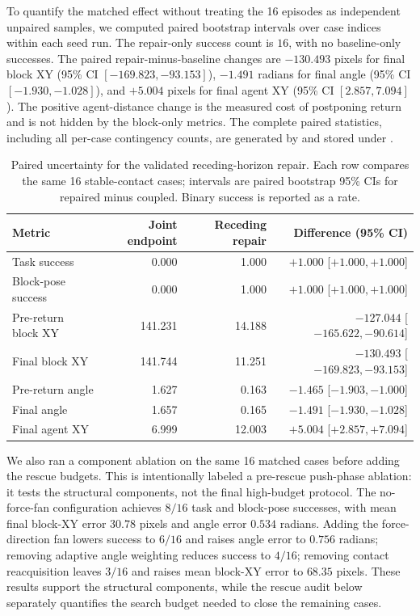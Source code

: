 \documentclass{article}
\begin{document}
To quantify the matched effect without treating the 16 episodes as independent
unpaired samples, we computed paired bootstrap intervals over case indices
within each seed run.  The repair-only success count is $16$, with no
baseline-only successes.  The paired repair-minus-baseline changes are
$-130.493$ pixels for final block XY (95\% CI
$[-169.823,-93.153]$), $-1.491$ radians for final angle (95\% CI
$[-1.930,-1.028]$), and $+5.004$ pixels for final agent XY (95\% CI
$[2.857,7.094]$).  The positive agent-distance change is the measured cost of
postponing return and is not hidden by the block-only metrics.  The complete
paired statistics, including all per-case contingency counts, are generated by
 and stored under
.

\begin{table}[H]
\centering
\scriptsize
\setlength{\tabcolsep}{4pt}
\caption{Paired uncertainty for the validated receding-horizon repair. Each
row compares the same 16 stable-contact cases; intervals are paired bootstrap
95\% CIs for repaired minus coupled. Binary success is reported as a rate.}
\label{tab:supp-receding-paired-stats}
\begin{tabular}{lrrr}
\toprule
Metric & Joint endpoint & Receding repair & Difference (95\% CI) \\
\midrule
Task success & 0.000 & 1.000 & $+1.000$ [$+1.000,+1.000$] \\
Block-pose success & 0.000 & 1.000 & $+1.000$ [$+1.000,+1.000$] \\
Pre-return block XY & 141.231 & 14.188 & $-127.044$ [$-165.622,-90.614$] \\
Final block XY & 141.744 & 11.251 & $-130.493$ [$-169.823,-93.153$] \\
Pre-return angle & 1.627 & 0.163 & $-1.465$ [$-1.903,-1.000$] \\
Final angle & 1.657 & 0.165 & $-1.491$ [$-1.930,-1.028$] \\
Final agent XY & 6.999 & 12.003 & $+5.004$ [$+2.857,+7.094$] \\
\bottomrule
\end{tabular}
\end{table}

We also ran a component ablation on the same 16 matched cases before adding
the rescue budgets.  This is intentionally labeled a pre-rescue push-phase
ablation: it tests the structural components, not the final high-budget
protocol.  The no-force-fan configuration achieves $8/16$ task and block-pose
successes, with mean final block-XY error $30.78$ pixels and angle error
$0.534$ radians.  Adding the force-direction fan lowers success to $6/16$ and
raises angle error to $0.756$ radians; removing adaptive angle weighting
reduces success to $4/16$; removing contact reacquisition leaves $3/16$ and
raises mean block-XY error to $68.35$ pixels.  These results support the
structural components, while the rescue audit below separately quantifies the
search budget needed to close the remaining cases.
\end{document}
